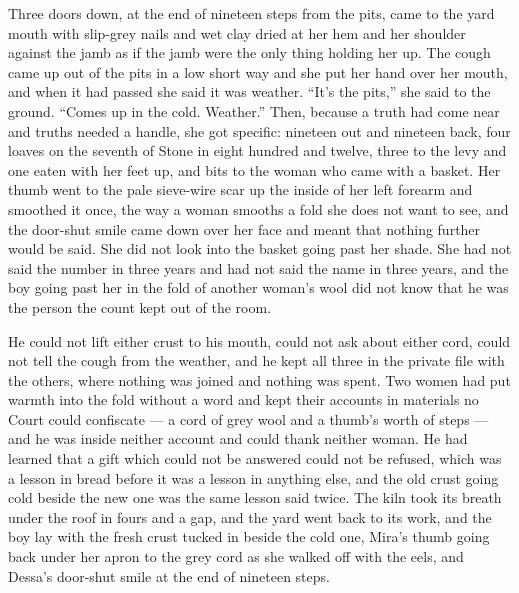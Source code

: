 Three doors down, at the end of nineteen steps from the pits,  came to the yard mouth with slip-grey nails and wet clay dried at her hem and her shoulder against the jamb as if the jamb were the only thing holding her up. The cough came up out of the pits in a low short way and she put her hand over her mouth, and when it had passed she said it was weather. “It's the pits,” she said to the ground. “Comes up in the cold. Weather.” Then, because a truth had come near and truths needed a handle, she got specific: nineteen out and nineteen back, four loaves on the seventh of Stone in eight hundred and twelve, three to the levy and one eaten with her feet up, and bits to the woman who came with a basket. Her thumb went to the pale sieve-wire scar up the inside of her left forearm and smoothed it once, the way a woman smooths a fold she does not want to see, and the door-shut smile came down over her face and meant that nothing further would be said. She did not look into the basket going past her shade. She had not said the number in three years and had not said the name in three years, and the boy going past her in the fold of another woman's wool did not know that he was the person the count kept out of the room.

He could not lift either crust to his mouth, could not ask about either cord, could not tell the cough from the weather, and he kept all three in the private file with the others, where nothing was joined and nothing was spent. Two women had put warmth into the fold without a word and kept their accounts in materials no Court could confiscate --- a cord of grey wool and a thumb's worth of steps --- and he was inside neither account and could thank neither woman. He had learned that a gift which could not be answered could not be refused, which was a lesson in bread before it was a lesson in anything else, and the old crust going cold beside the new one was the same lesson said twice. The kiln took its breath under the roof in fours and a gap, and the yard went back to its work, and the boy lay with the fresh crust tucked in beside the cold one, Mira's thumb going back under her apron to the grey cord as she walked off with the eels, and Dessa's door-shut smile at the end of nineteen steps.
